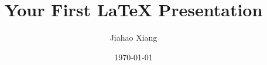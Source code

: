 \documentclass{beamer}
\title{Your First \LaTeX{} Presentation}
\author{Jiahao Xiang}
\date{\today}
\begin{document}
\begin{frame}
    \titlepage
\end{frame}
\end{document}
